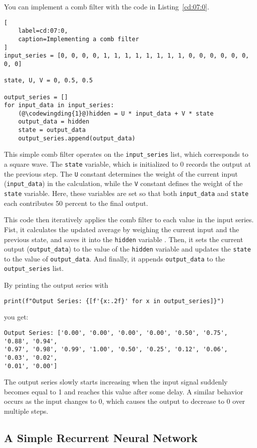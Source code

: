 You can implement a comb filter with the code in Listing~\ref{cd:07:0}.
\begin{lstlisting}[
    label=cd:07:0,
    caption=Implementing a comb filter 
]
input_series = [0, 0, 0, 0, 1, 1, 1, 1, 1, 1, 1, 1, 0, 0, 0, 0, 0, 0, 0, 0]

state, U, V = 0, 0.5, 0.5

output_series = []
for input_data in input_series:
    (@\codewingding{1}@)hidden = U * input_data + V * state
    output_data = hidden
    state = output_data
    output_series.append(output_data)
\end{lstlisting}
This simple comb filter operates on the \lstinline{input_series} list, which corresponds to a square wave. 
The \lstinline{state} variable, which is initialized to 0 records the output at the previous step.
The \lstinline{U} constant determines the weight of the current input (\lstinline{input_data}) in the calculation, while the \lstinline{V} constant
defines the weight of the \lstinline{state} variable. Here, these variables are set so that both \lstinline{input_data} and \lstinline{state} each contributes 50 percent to the final output.

This code then iteratively applies the comb filter to each value in the input series.
Fist, it calculates the updated average by weighing the current input and the previous state, and saves it into the \lstinline{hidden} variable .
Then, it sets the current output (\lstinline{output_data}) to the value of the \lstinline{hidden} variable and updates the \lstinline{state} to the value of \lstinline{output_data}. And finally, it appends \lstinline{output_data} to the \lstinline{output_series} list.

By printing the output series with
\begin{lstlisting}
print(f"Output Series: {[f'{x:.2f}' for x in output_series]}")
\end{lstlisting}
you get:
\begin{lstlisting}
Output Series: ['0.00', '0.00', '0.00', '0.00', '0.50', '0.75', '0.88', '0.94', 
'0.97', '0.98', '0.99', '1.00', '0.50', '0.25', '0.12', '0.06', '0.03', '0.02', 
'0.01', '0.00']
\end{lstlisting}
The output series slowly starts increasing when the input signal suddenly becomes equal to 1 and reaches this value after some delay. A similar behavior occurs as the input changes to 0, which causes the output to decrease to 0 over multiple steps.

\subsection{A Simple Recurrent Neural Network}

